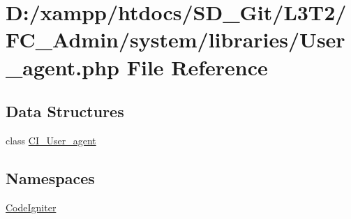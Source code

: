 \hypertarget{_admin_2system_2libraries_2_user__agent_8php}{}\section{D\+:/xampp/htdocs/\+S\+D\+\_\+\+Git/\+L3\+T2/\+F\+C\+\_\+\+Admin/system/libraries/\+User\+\_\+agent.php File Reference}
\label{_admin_2system_2libraries_2_user__agent_8php}
\subsection*{Data Structures}
\begin{DoxyCompactItemize}
\item 
class \hyperlink{class_c_i___user__agent}{C\+I\+\_\+\+User\+\_\+agent}
\end{DoxyCompactItemize}
\subsection*{Namespaces}
\begin{DoxyCompactItemize}
\item 
 \hyperlink{namespace_code_igniter}{Code\+Igniter}
\end{DoxyCompactItemize}

